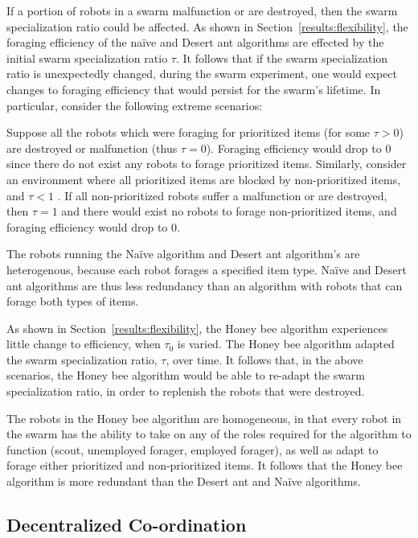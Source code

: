 If a portion of robots in a swarm malfunction or are destroyed, then the swarm specialization ratio could be affected. As shown in Section~\ref{results:flexibility}, the foraging efficiency of the na\"ive and Desert ant algorithms are effected by the initial swarm specialization ratio $\tau$. It follows that if the swarm specialization ratio is unexpectedly changed, during the swarm experiment, one would expect changes to foraging efficiency that would persist for the swarm's lifetime. In particular, consider the following extreme scenarios: 

Suppose all the robots which were foraging for prioritized items (for some $\tau > 0$) are destroyed or malfunction (thus $\tau=0$). Foraging efficiency would drop to 0 since there do not exist any robots to forage prioritized items. Similarly, consider an environment where all prioritized items are blocked by non-prioritized items, and $\tau < 1$ . If all non-prioritized robots suffer a malfunction or are destroyed, then $\tau=1$ and there would exist no robots to forage non-prioritized items, and foraging efficiency would drop to 0. 

The robots running the Na\"ive algorithm and Desert ant algorithm's are heterogenous, because each robot forages a specified item type. Na\"ive and Desert ant algorithms are thus less redundancy than an algorithm with robots that can forage both types of items.

As shown in Section~\ref{results:flexibility}, the Honey bee algorithm experiences little change to efficiency, when $\tau_0$ is varied. The Honey bee algorithm adapted the swarm specialization ratio, $\tau$, over time. It follows that, in the above scenarios, the Honey bee algorithm would be able to re-adapt the swarm specialization ratio, in order to replenish the robots that were destroyed. 

The robots in the Honey bee algorithm are homogeneous, in that every robot in the swarm has the ability to take on any of the roles required for the algorithm to function (scout, unemployed forager, employed forager), as well as adapt to forage either prioritized and non-prioritized items. It follows that the Honey bee algorithm is more redundant than the Desert ant and Na\"ive algorithms.

\subsection{Decentralized Co-ordination}
\label{results:decentralizedcoordination}


